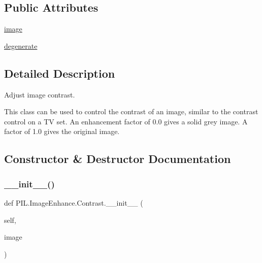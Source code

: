 \subsection*{Public Attributes}
\begin{DoxyCompactItemize}
\item 
\hyperlink{classPIL_1_1ImageEnhance_1_1Contrast_aead873f9ac0d69b50f5abdc78ca3c140}{image}
\item 
\hyperlink{classPIL_1_1ImageEnhance_1_1Contrast_ac7e9ce534ba95714306874f9c8fbc991}{degenerate}
\end{DoxyCompactItemize}


\subsection{Detailed Description}
\begin{DoxyVerb}Adjust image contrast.

This class can be used to control the contrast of an image, similar
to the contrast control on a TV set. An enhancement factor of 0.0
gives a solid grey image. A factor of 1.0 gives the original image.
\end{DoxyVerb}
 

\subsection{Constructor \& Destructor Documentation}
\mbox{\label{classPIL_1_1ImageEnhance_1_1Contrast_ab9055bde0f26de232981904d4e841a28}} 
\subsubsection{\texorpdfstring{\+\_\+\+\_\+init\+\_\+\+\_\+()}{\_\_init\_\_()}}
{\footnotesize\ttfamily def P\+I\+L.\+Image\+Enhance.\+Contrast.\+\_\+\+\_\+init\+\_\+\+\_\+ (\begin{DoxyParamCaption}\item[{}]{self,  }\item[{}]{image }\end{DoxyParamCaption})}



